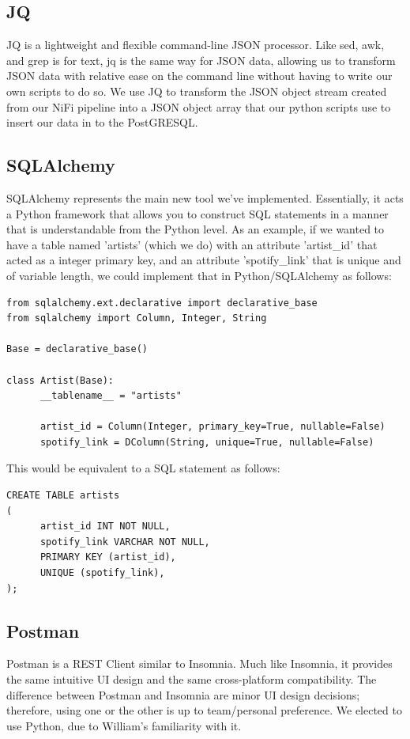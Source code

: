 \documentclass{scrartcl}
\begin{document}
\subsection{JQ}
JQ is a lightweight and flexible command-line JSON processor. Like sed, awk, and grep is for text, jq is the same way for JSON data, allowing us to transform JSON data with relative ease on the command line without having to write our own scripts to do so. We use JQ to transform the JSON object stream created from our NiFi pipeline into a JSON object array that our python scripts use to insert our data in to the PostGRESQL.

\subsection{SQLAlchemy}
SQLAlchemy represents the main new tool we've implemented. Essentially, it acts a Python framework that allows you to construct SQL statements in a manner that is understandable from the Python level. As an example, if we wanted to have a table named 'artists' (which we do) with an attribute 'artist\_id' that acted as a integer primary key, and an attribute 'spotify\_link' that is unique and of variable length, we could implement that in Python/SQLAlchemy as follows:

\begin{verbatim}
from sqlalchemy.ext.declarative import declarative_base
from sqlalchemy import Column, Integer, String

Base = declarative_base()

class Artist(Base):
      __tablename__ = "artists"

      artist_id = Column(Integer, primary_key=True, nullable=False)
      spotify_link = DColumn(String, unique=True, nullable=False)
\end{verbatim}

This would be equivalent to a SQL statement as follows:

\begin{verbatim}
CREATE TABLE artists
(
      artist_id INT NOT NULL,
      spotify_link VARCHAR NOT NULL,
      PRIMARY KEY (artist_id),
      UNIQUE (spotify_link),
);
\end{verbatim}

\subsection{Postman}
Postman is a REST Client similar to Insomnia. Much like Insomnia, it provides the same intuitive UI design and the same cross-platform compatibility. The difference between Postman and Insomnia are minor UI design decisions; therefore, using one or the other is up to team/personal preference. We elected to use Python, due to William's familiarity with it.
\end{document}

